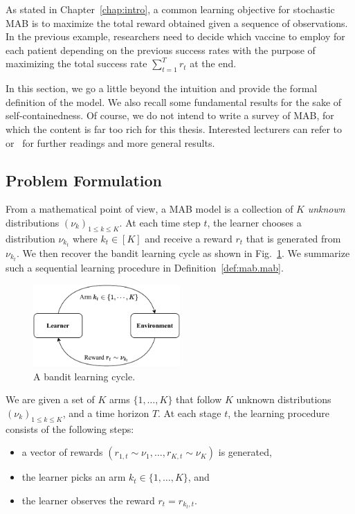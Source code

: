 As stated in Chapter~\ref{chap:intro}, a common learning objective for stochastic MAB is to maximize the total reward obtained given a sequence of observations. In the previous example, researchers need to decide which vaccine to employ for each patient depending on the previous success rates with the purpose of maximizing the total success rate $\sum_{t=1}^T r_t$ at the end.

In this section, we go a little beyond the intuition and provide the formal definition of the model. We also recall some fundamental results for the sake of self-containedness. Of course, we do not intend to write a survey of MAB, for which the content is far too rich for this thesis. Interested lecturers can refer to~\cite{bubeck2012bandits,lattimore2018bandits} or~\cite{slivkins2019bandits} for further readings and more general results.

\subsection{Problem Formulation}\label{sec:mab.model.formulation}

From a mathematical point of view, a MAB model is a collection of $K$ \emph{unknown} distributions $(\nu_k)_{1 \leq k \leq K}$. At each time step $t$, the learner chooses a distribution $\nu_{k_t}$ where $k_t\in[K]$ and receive a reward $r_t$ that is generated from $\nu_{k_t}$. We then recover the bandit learning cycle as shown in Fig.~\ref{fig:mab.mab}. We summarize such a sequential learning procedure in Definition~\ref{def:mab.mab}.

\begin{figure}[ht]
    \centering
    \includegraphics[width=0.5\textwidth]{Chapter2/img/mab_bis.pdf}
    \caption{A bandit learning cycle.}
    \label{fig:mab.mab}
\end{figure}

\begin{definition}\label{def:mab.mab}
\begin{leftbar}[defnbar]
	We are given a set of $K$ arms $\{1,\ldots,K\}$ that follow $K$ unknown distributions $(\nu_k)_{1 \leq k \leq K}$, and a time horizon $T$. At each stage $t$, the learning procedure consists of the following steps:
	\begin{itemize}
		\item a vector of rewards $(r_{1,t} \sim \nu_1, \ldots, r_{K,t} \sim \nu_K)$ is generated,
		\item the learner picks an arm $k_t \in \{1,\ldots,K\}$, and
		\item the learner observes the reward $r_t = r_{k_t, t}$.
	\end{itemize}
\end{leftbar}
\end{definition}

